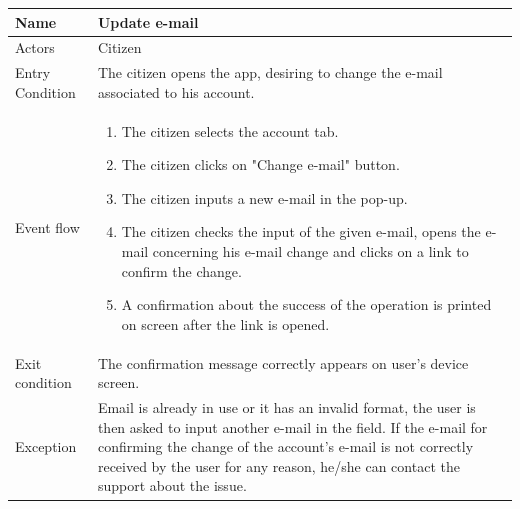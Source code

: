 \vskip 0.2in
\begin{tabular}{|p{3.1cm}|p{11.6cm}|}
	\hline
	Name & Update e-mail\\
	\hline
	Actors & Citizen\\
	\hline
	Entry Condition & The citizen opens the app, desiring to change the e-mail associated to his account.\\
	\hline
	Event flow & \begin{enumerate}
		\item The citizen selects the account tab.
		\item The citizen clicks on "Change e-mail" button.
		\item The citizen inputs a new e-mail in the pop-up.
		\item The citizen checks the input of the given e-mail, opens the e-mail concerning his e-mail change and clicks on a link to confirm the change.
		\item A confirmation about the success of the operation is printed on screen after the link is opened.
	\end{enumerate}\\
	\hline
	Exit condition & The confirmation message correctly appears on user's device screen.\\
	\hline
	Exception & Email is already in use or it has an invalid format, the user is then asked to input another e-mail in the field. If the e-mail for confirming the change of the account's e-mail is not correctly received by the user for any reason, he/she can contact the support about the issue.\\
	\hline
\end{tabular}

